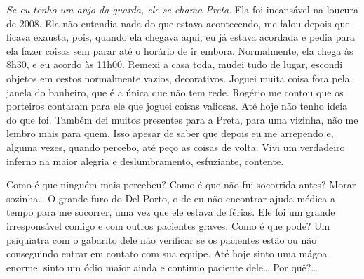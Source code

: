 \emph{Se eu tenho um anjo da guarda, ele se chama Preta}. Ela foi
incansável na loucura de 2008. Ela não entendia nada do que estava
acontecendo, me falou depois que ficava exausta, pois, quando ela
chegava aqui, eu já estava acordada e pedia para ela fazer coisas sem
parar até o horário de ir embora. Normalmente, ela chega às 8h30, e eu
acordo às 11h00. Remexi a casa toda, mudei tudo de lugar, escondi
objetos em cestos normalmente vazios, decorativos. Joguei muita coisa
fora pela janela do banheiro, que é a única que não tem rede. Rogério me
contou que os porteiros contaram para ele que joguei coisas valiosas.
Até hoje não tenho ideia do que foi. Também dei muitos presentes para a
Preta, para uma vizinha, não me lembro mais para quem. Isso apesar de
saber que depois eu me arrependo e, alguma vezes, quando percebo, até
peço as coisas de volta. Vivi um verdadeiro inferno na maior alegria e
deslumbramento, esfuziante, contente.

Como é que ninguém mais percebeu? Como é que não fui socorrida antes?
Morar sozinha… O grande furo do Del Porto, o de eu não encontrar
ajuda médica a tempo para me socorrer, uma vez que ele estava de férias.
Ele foi um grande irresponsável comigo e com outros pacientes graves.
Como é que pode? Um psiquiatra com o gabarito dele não verificar se os
pacientes estão ou não conseguindo entrar em contato com sua equipe. Até
hoje sinto uma mágoa enorme, sinto um ódio maior ainda e continuo
paciente dele… Por quê?…

